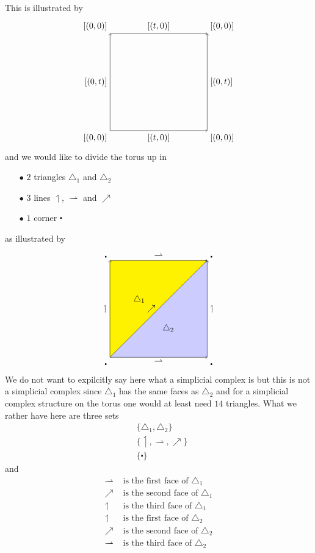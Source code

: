This is illustrated by
\[
\begin{tikzpicture}[scale=4]
  \draw[->]
    (0,0) node[below left] {$[(0,0)]$}
    -- node[below] {$[(t,0)]$}
    (1,0) node[below right] {$[(0,0)]$};
  \draw[->]
    (0,1) node[above left] {$[(0,0)]$}
    -- node[above] {$[(t,0)]$}
    (1,1) node[above right] {$[(0,0)]$};
  \draw[->]
    (0,0)
    -- node[left] {$[(0,t)]$}
    (0,1) ;
  \draw[->]
    (1,0)
    -- node[right] {$[(0,t)]$}
    (1,1);
\end{tikzpicture}
\]
and we would like to divide the torus up in
\begin{enumerate}
\item[$\bullet$]
$2$ triangles $\triangle_{1}$ and $\triangle_{2}$
\item[$\bullet$]
$3$ lines $\upharpoonleft$, $\rightharpoonup$ and $\nearrow$
\item[$\bullet$]
$1$ corner $\centerdot$
\end{enumerate}
as illustrated by
\[
\begin{tikzpicture}[scale=4]
  \fill[yellow]
    (0,0)
    --
    (0,1)
    --
    (1,1)
    --
    cycle;
  \fill[blue!20]
    (0,0)
    --
    (1,0)
    --
    (1,1)
    --
    cycle;
  \draw
    (0.3,0.6) node {$\triangle_{1}$};
  \draw
    (0.6,0.3) node {$\triangle_{2}$};
  \draw[->]
    (0,0) node[below left] {$\centerdot$}
    -- node[below] {$\rightharpoonup$}
    (1,0) node[below right] {$\centerdot$};
  \draw[->]
    (0,1) node[above left] {$\centerdot$}
    -- node[above] {$\rightharpoonup$}
    (1,1) node[above right] {$\centerdot$};
  \draw[->]
    (0,0)
    -- node[left] {$\nearrow$}
    (1,1);
  \draw[->]
    (0,0)
    -- node[left] {$\upharpoonleft$}
    (0,1);
  \draw[->]
    (1,0)
    -- node[right] {$\upharpoonleft$}
    (1,1);
\end{tikzpicture}
\]
We do not want to expilcitly say here what a simplicial complex is but this is not a simplicial complex since $\triangle_{1}$ has the same faces as $\triangle_{2}$ and for a simplicial complex structure on the torus one would at least need $14$ triangles. What we rather have here are three sets
\begin{align*}
  &
  \lbrace
    \triangle_{1},
    \triangle_{2}
  \rbrace
  \\
  &
  \lbrace
    \upharpoonleft,
    \rightharpoonup,
    \nearrow
  \rbrace
  \\
  &
  \lbrace
    \centerdot
  \rbrace
\end{align*}
and
\begin{align*}
  \rightharpoonup
  &\text{ is the first face of }
  \triangle_{1}
  \\
  \nearrow
  &\text{ is the second face of }
  \triangle_{1}
  \\
  \upharpoonleft
  &\text{ is the third face of }
  \triangle_{1}
  \\
  \upharpoonleft
  &\text{ is the first face of }
  \triangle_{2}
  \\
  \nearrow
  &\text{ is the second face of }
  \triangle_{2}
  \\
  \rightharpoonup
  &\text{ is the third face of }
  \triangle_{2}
\end{align*}
